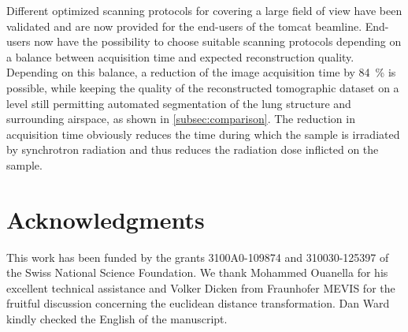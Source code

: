 Different optimized scanning protocols for covering a large field of view have been validated and are now provided for the end-users of the \ac{tomcat} beamline. End-users now have the possibility to choose suitable scanning protocols depending on a balance between acquisition time and expected reconstruction quality. Depending on this balance, a reduction of the image acquisition time by \SI{84}{\percent} is possible, while keeping the quality of the reconstructed tomographic dataset on a level still permitting automated segmentation of the lung structure and surrounding airspace, as shown in \autoref{subsec:comparison}. The reduction in acquisition time obviously reduces the time during which the sample is irradiated by synchrotron radiation and thus reduces the radiation dose inflicted on the sample.

\section{Acknowledgments}
This work has been funded by the grants 3100A0-109874 and 310030-125397 of the Swiss National Science Foundation. We thank Mohammed Ouanella for his excellent technical assistance and Volker Dicken from Fraunhofer MEVIS for the fruitful discussion concerning the euclidean distance transformation. Dan Ward kindly checked the English of the manuscript.
%
%